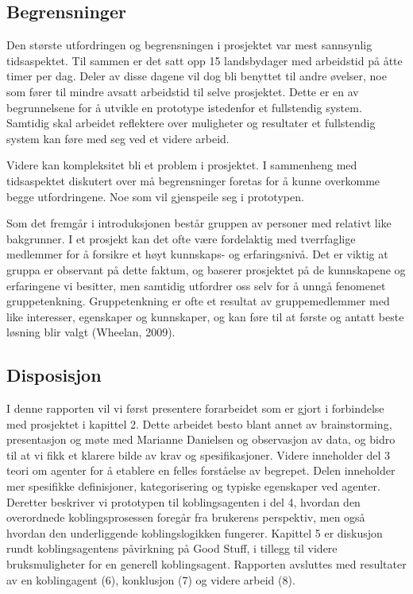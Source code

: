 \subsection{Begrensninger}

Den største utfordringen og begrensningen i prosjektet var mest sannsynlig tidsaspektet. Til sammen er det satt opp 15 landsbydager med arbeidstid på åtte timer per dag. Deler av disse dagene vil dog bli benyttet til andre øvelser, noe som fører til mindre avsatt arbeidstid til selve prosjektet. Dette er en av begrunnelsene for å utvikle en prototype istedenfor et fullstendig system. Samtidig skal arbeidet reflektere over muligheter og resultater et fullstendig system kan føre med seg ved et videre arbeid.

Videre kan kompleksitet bli et problem i prosjektet. I sammenheng med tidsaspektet diskutert over må begrensninger foretas for å kunne overkomme begge utfordringene. Noe som vil gjenspeile seg i prototypen.

Som det fremgår i introduksjonen består gruppen av personer med relativt like bakgrunner. I et prosjekt kan det ofte være fordelaktig med tverrfaglige medlemmer for å forsikre et høyt kunnskaps- og erfaringsnivå. Det er viktig at gruppa er observant på dette faktum, og baserer prosjektet på de kunnskapene og erfaringene vi besitter, men samtidig utfordrer oss selv for å unngå fenomenet gruppetenkning. Gruppetenkning er ofte et resultat av gruppemedlemmer med like interesser, egenskaper og kunnskaper, og kan føre til at første og antatt beste løsning blir valgt (Wheelan, 2009).

\subsection{Disposisjon}

I denne rapporten vil vi først presentere forarbeidet som er gjort i forbindelse med prosjektet i kapittel 2. Dette arbeidet besto blant annet av brainstorming, presentasjon og møte med Marianne Danielsen og observasjon av data, og bidro til at vi fikk et klarere bilde av krav og spesifikasjoner. Videre inneholder del 3 teori om agenter for å etablere en felles forståelse av begrepet. Delen inneholder mer spesifikke definisjoner, kategorisering og typiske egenskaper ved agenter. Deretter beskriver vi prototypen til koblingsagenten i del 4, hvordan den overordnede koblingsprosessen foregår fra brukerens perspektiv, men også hvordan den underliggende koblingslogikken fungerer. Kapittel 5 er diskusjon rundt koblingsagentens påvirkning på Good Stuff, i tillegg til videre bruksmuligheter for en generell koblingsagent. Rapporten avsluttes med resultater av en koblingagent (6), konklusjon (7) og videre arbeid (8).